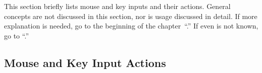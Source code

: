 	This section briefly lists mouse and key
	inputs and their actions.%
	General concepts are not discussed in this section,
	nor is usage discussed in detail. If more explanation
	is needed, go to the beginning of the
	chapter~``.''
	If even \IXpov{} is not known, go to
	``.''
	
		\subsection{Mouse and Key Input Actions}%
		\label{ssec:input_to_action}

